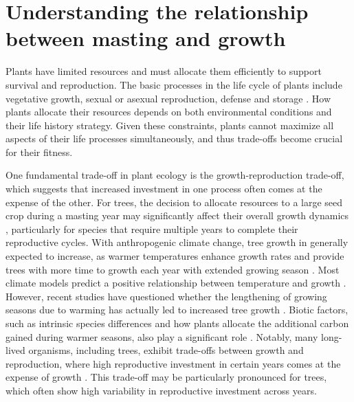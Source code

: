 \documentclass[11pt,letter]{article}
\begin{document}
\section{Understanding the relationship between masting and growth}
Plants have limited resources and must allocate them efficiently to support survival and reproduction. The basic processes in the life cycle of plants include vegetative growth, sexual or asexual reproduction, defense and storage \citep{bazzaz1997plant}. How plants allocate their resources depends on both environmental conditions and their life history strategy. Given these constraints, plants cannot maximize all aspects of their life processes simultaneously, and thus trade-offs become crucial for their fitness.\par
One fundamental trade-off in plant ecology is the growth-reproduction trade-off, which suggests that increased investment in one process often comes at the expense of the other\citep{stearns1998evolution}. For trees, the decision to allocate resources to a large seed crop during a masting year may significantly affect their overall growth dynamics \citep{hacket2016tree}, particularly for species that require multiple years to complete their reproductive cycles. With anthropogenic climate change, tree growth in generally expected to increase, as warmer temperatures enhance growth rates and provide trees with more time to growth each year with extended growing season \citep{keenan2014net, finzi2020carbon}. Most climate models predict a positive relationship between temperature and growth \citep{ito2020global, friedlingstein2022global}. However, recent studies have questioned whether the lengthening of growing seasons due to warming has actually led to increased tree growth \citep{dow2022warm, green2022limits}.  Biotic factors, such as intrinsic species differences and how plants allocate the additional carbon gained during warmer seasons, also play a significant role \citep{hacket2016consistent}. Notably, many long-lived organisms, including trees, exhibit trade-offs between growth and reproduction, where high reproductive investment in certain years comes at the expense of growth \citep{stearns1998evolution}. This trade-off may be particularly pronounced for trees, which often show high variability in reproductive investment across years.\par
\end{document}
